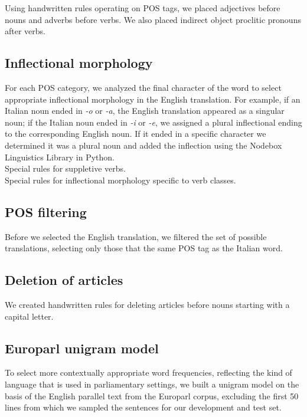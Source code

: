 \documentclass{article}
\begin{document}
Using handwritten rules operating on POS tags, we placed adjectives before nouns and adverbs before verbs. We also placed indirect object proclitic pronouns after verbs.

\subsection{Inflectional morphology}

For each POS category, we analyzed the final character of the word to select appropriate inflectional morphology in the English translation. For example, if an Italian noun ended in \textit{-o} or \textit{-a}, the English translation appeared as a singular noun; if the Italian noun ended in \textit{-i} or \textit{-e}, we assigned a plural inflectional ending to the corresponding English noun. If it ended in a specific character we determined it was a plural noun and added the inflection using the Nodebox Linguistics Library in Python. \\

Special rules for suppletive verbs. \\

Special rules for inflectional morphology specific to verb classes.

\subsection{POS filtering}

Before we selected the English translation, we filtered the set of possible translations, selecting only those that the same POS tag as the Italian word.
 
\subsection{Deletion of articles}

We created handwritten rules for deleting articles before nouns starting with a capital letter.

\subsection{Europarl unigram model}

To select more contextually appropriate word frequencies, reflecting the kind of language that is used in parliamentary settings, we built a unigram model on the basis of the English parallel text from the Europarl corpus, excluding the first 50 lines from which we sampled the sentences for our development and test set. \\
 
\end{document}
